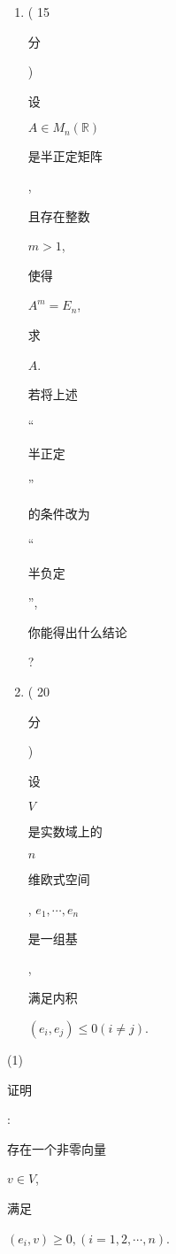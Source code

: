 \documentclass[10pt]{article}
\begin{document}
\begin{enumerate}
  \item ( 15 \begin{CJK}{UTF8}{mj}分\end{CJK}) \begin{CJK}{UTF8}{mj}设\end{CJK} $A \in M_{n}(\mathbb{R})$ \begin{CJK}{UTF8}{mj}是半正定矩阵\end{CJK}, \begin{CJK}{UTF8}{mj}且存在整数\end{CJK} $m>1$, \begin{CJK}{UTF8}{mj}使得\end{CJK} $A^{m}=E_{n}$, \begin{CJK}{UTF8}{mj}求\end{CJK} $A$. \begin{CJK}{UTF8}{mj}若将上述\end{CJK} “\begin{CJK}{UTF8}{mj}半正定\end{CJK}” \begin{CJK}{UTF8}{mj}的条件改为\end{CJK} “\begin{CJK}{UTF8}{mj}半负定\end{CJK}”, \begin{CJK}{UTF8}{mj}你能得出什么结论\end{CJK}?

  \item ( 20 \begin{CJK}{UTF8}{mj}分\end{CJK}) \begin{CJK}{UTF8}{mj}设\end{CJK} $V$ \begin{CJK}{UTF8}{mj}是实数域上的\end{CJK} $n$ \begin{CJK}{UTF8}{mj}维欧式空间\end{CJK}, $e_{1}, \cdots, e_{n}$ \begin{CJK}{UTF8}{mj}是一组基\end{CJK}, \begin{CJK}{UTF8}{mj}满足内积\end{CJK} $\left(e_{i}, e_{j}\right) \leq 0(i \neq j)$.

\end{enumerate}
(1) \begin{CJK}{UTF8}{mj}证明\end{CJK}: \begin{CJK}{UTF8}{mj}存在一个非零向量\end{CJK} $v \in V$, \begin{CJK}{UTF8}{mj}满足\end{CJK} $\left(e_{i}, v\right) \geq 0,(i=1,2, \cdots, n)$.
\end{document}
